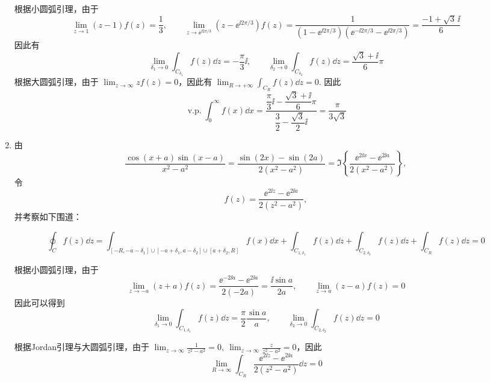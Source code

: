 \begin{question}
\begin{solution}
\begin{enumerate}
根据小圆弧引理，由于
\[
\lim_{z\to1}(z-1)f(z)=\frac13,\qquad \lim_{z\to\ee^{\ii2\pi/3}}(z-\ee^{\ii2\pi/3})f(z)=\frac{1}{(1-\ee^{\ii2\pi/3})(\ee^{-\ii2\pi/3}-\ee^{\ii2\pi/3})}=\frac{-1+\sqrt3\,\ii}{6}
\]
因此有
\[
\lim_{\delta_1\to0}\int_{C_{\delta_1}}f(z)\dd{z}=-\frac{\pi}{3}\ii,\qquad \lim_{\delta_2\to0}\int_{C_{\delta_2}}f(z)\dd{z}=\frac{\sqrt3+\ii}{6}\pi
\]
根据大圆弧引理，由于 \(\displaystyle\lim_{z\to\infty}zf(z)=0\)，因此有 \(\displaystyle\lim_{R\to+\infty}\int_{C_R}f(z)\dd{z}=0\). 因此
\[
\operatorname{v.p.}\int_{0}^{\infty}f(x)\dd{x}=\frac{\dfrac{\pi}{3}\ii-\dfrac{\sqrt3+\ii}{6}\pi}{\dfrac32-\dfrac{\sqrt3}{2}\ii}=\frac{\pi}{3\sqrt3}
\]

  \item 由
  \[
  \frac{\cos(x+a)\sin(x-a)}{x^2-a^2}
  =\frac{\sin(2x)-\sin(2a)}{2(x^2-a^2)}
  =\Im\left\{\frac{\ee^{2\ii x}-\ee^{2\ii a}}
  {2(x^2-a^2)}\right\},
  \]
  令
  \[
  f(z)=\frac{\ee^{2\ii z}-\ee^{2\ii a}}{2(z^2-a^2)},
  \]
  并考察如下围道：

\begin{center}
\end{center}

\[
\oint_C f(z)\dd{z}=\int_{[-R,-a-\delta_1]\cup[-a+\delta_1,a-\delta_2]\cup[a+\delta_2,R]}f(x)\dd{x}+\int_{C_{1,\delta_1}}f(z)\dd{z}+\int_{C_{2,\delta_2}}f(z)\dd{z}+\int_{C_R}f(z)\dd{z}=0
\]

根据小圆弧引理，由于
\[
\lim_{z\to-a}(z+a)f(z)=\frac{\ee^{-2\ii a}-\ee^{2\ii a}}{2(-2a)}=\frac{\ii\sin a}{2a},\qquad \lim_{z\to a}(z-a)f(z)=0
\]
因此可以得到
\[
\lim_{\delta_1\to0}\int_{C_{1,\delta_1}}f(z)\dd{z}=\frac{\pi}{2}\frac{\sin a}{a},\qquad \lim_{\delta_2\to0}\int_{C_{2,\delta_2}}f(z)\dd{z}=0
\]

根据Jordan引理与大圆弧引理，由于 \(\displaystyle\lim_{z\to\infty}\frac{1}{z^2-a^2}=0,\ \lim_{z\to\infty}\frac{z}{z^2-a^2}=0\)，因此
\[
\lim_{R\to\infty}\int_{C_R}\frac{\ee^{2\ii z}-\ee^{2\ii a}}{2(z^2-a^2)}\dd{z}=0
\]


\end{enumerate}
\end{solution}
\end{question}
